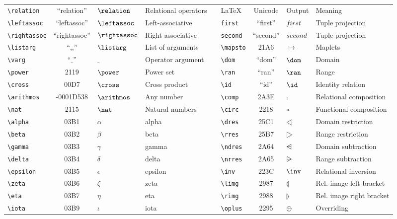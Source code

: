 \begin{tabular}{lcllllcll}
\cline{6-9}
\verb'\relation' & ``relation'' & $\relation$ & Relational operators & \multicolumn{1}{l|}{} & \multicolumn{1}{l|}{\LaTeX} & \multicolumn{1}{c|}{Unicode} & \multicolumn{1}{l|}{Output} & \multicolumn{1}{l|}{Meaning} \\
\cline{6-9}
\verb'\leftassoc' & ``leftassoc'' & $\leftassoc$ & Left-associative &  & \verb'first' & ``first'' & $first$ & Tuple projection \\
\verb'\rightassoc' & ``rightassoc'' & $\rightassoc$ & Right-associative &  & \verb'second' & ``second'' & $second$ & Tuple projection \\
\verb'\listarg' & ``{,}{,}'' & $\listarg$ & List of arguments &  & \verb'\mapsto' & 21A6 & $\mapsto$ & Maplets \\
\verb'\varg' & ``$\_$'' & $\_$ & Operator argument &  & \verb'\dom' & ``dom'' & $\dom$ & Domain \\
\verb'\power' & 2119 & $\power$ & Power set &  & \verb'\ran' & ``ran'' & $\ran$ & Range \\
\verb'\cross' & 00D7 & $\cross$ & Cross product &  & \verb'\id' & ``id'' & $\id$ & Identity relation \\
\verb'\arithmos'  & -0001D538 & $\arithmos$ & Any number &  & \verb'\comp' & 2A3E & $\comp$ & Relational composition \\
\verb'\nat' & 2115 & $\nat$ & Natural numbers &  & \verb'\circ' & 2218 & $\circ$ & Functional composition \\
\verb'\alpha' & 03B1 & $\alpha$ & alpha &  & \verb'\dres' & 25C1 & $\dres$ & Domain restriction \\
\verb'\beta' & 03B2 & $\beta$ & beta &  & \verb'\rres' & 25B7 & $\rres$ & Range restriction \\
\verb'\gamma' & 03B3 & $\gamma$ & gamma &  & \verb'\ndres' & 2A64 & $\ndres$ & Domain subtraction \\
\verb'\delta' & 03B4 & $\delta$ & delta &  & \verb'\nrres' & 2A65 & $\nrres$ & Range subtraction \\
\verb'\epsilon' & 03B5 & $\epsilon$ & epsilon &  & \verb'\inv' & 223C & $\inv$ & Relational inversion \\
\verb'\zeta' & 03B6 & $\zeta$ & zeta &  & \verb'\limg' & 2987 & $\limg$ & Rel. image left bracket \\
\verb'\eta' & 03B7 & $\eta$ & eta &  & \verb'\rimg' & 2988 & $\rimg$ & Rel. image right bracket \\
\verb'\iota'  & 03B9 & $\iota$ & iota &  & \verb'\oplus' & 2295 & $\oplus$ & Overriding \\

\end{tabular}

